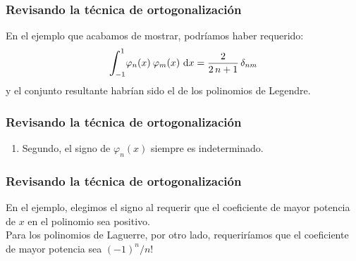 \documentclass[12pt]{beamer}
\begin{document}
\begin{frame}
\frametitle{Revisando la técnica de ortogonalización}
En el ejemplo que acabamos de mostrar, podríamos haber requerido:
\pause
\begin{align}
\scaleint{6ex}_{\bs -1}^{1} \varphi_{n} (x) \: \varphi_{m} (x) \, \dd{x} = \dfrac{2}{2 \, n + 1} \, \delta_{nm}
\label{eq:ecuacion_10_61}
\end{align}
y el conjunto resultante habrían sido el de los polinomios de Legendre.
\end{frame}
\begin{frame}
\frametitle{Revisando la técnica de ortogonalización}
\begin{enumerate}[<+->]  
\conti
\item Segundo, el signo de $\varphi_{n} (x)$ siempre es indeterminado.
\end{enumerate}
\end{frame}
\begin{frame}
\frametitle{Revisando la técnica de ortogonalización}
En el ejemplo, elegimos el signo al requerir que el coeficiente de mayor potencia de $x$ en el polinomio sea positivo. 
\\
\bigskip
\pause
Para los polinomios de Laguerre, por otro lado, requeriríamos que el coeficiente de mayor potencia sea $(-1)^{n}/n!$
\end{frame}

\end{document}
